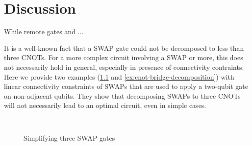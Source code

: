  
\chapter{Discussion}\label{chap:discussion}

While remote gates and ...

It is a well-known fact that a SWAP gate could not be decomposed to less than three CNOTs. For a more complex circuit involving a SWAP or more, this does not necessarily hold in general, especially in presence of connectivity contraints. Here we provide two examples (\ref{ex:swap-swap-decomposition} and \ref{ex:cnot-bridge-decomposition}) with linear connectivity constraints of SWAPs that are used to apply a two-qubit gate on non-adjacent qubits.
They show that decomposing SWAPs to three CNOTs will not necessarily lead to an optimal circuit, even in simple cases.

\begin{figure}[ht]
  \centering
   \\

  \caption{Simplifying three SWAP gates}
  \label{ex:swap-swap-decomposition}
\end{figure}

